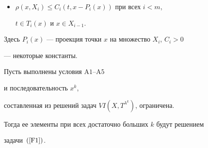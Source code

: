 \begin{itemize}


\item[A5.] $\rho(x,X_i)\le C_i(t, x-P_i (x))$ при всех $i<m$,


$t\in T_i(x)$ и $x\in X_{i-1}$. 


\end{itemize}





Здесь $P_i (x)$ --- проекция точки $x$ на множество $X_i$, $C_i>0$


--- некоторые константы.





\begin{thm}


Пусть выполнены условия $\mathrm A 1$--$\mathrm A 5$


и последовательность $x^k$,


составленная из решений задач $VI(X,T^{\lambda^k})$, ограничена.


Тогда ее элементы при всех достаточно больших $k$ будут решением


задачи~$(\ref{F1})$.


\end{thm}






